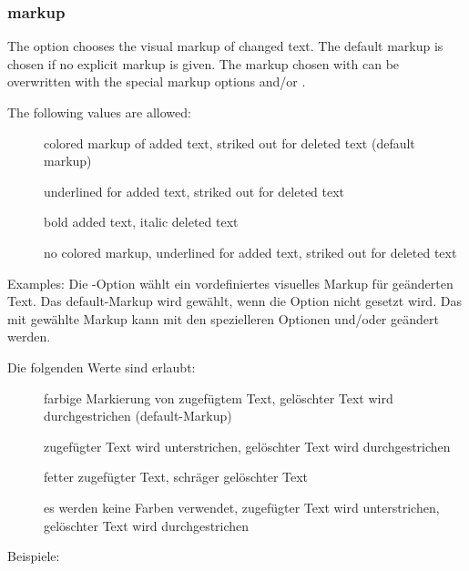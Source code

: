 
\subsubsection{markup}
\ifENGLISH
The  option chooses the visual markup of changed text.
The default markup is chosen if no explicit markup is given.
The markup chosen with  can be overwritten with the special markup options  and/or .

The following values are allowed:
\begin{description}
	\item [] colored markup of added text, striked out for deleted text (default markup)
	\item [] underlined for added text, striked out for deleted text
	\item [] bold added text, italic deleted text
	\item [] no colored markup, underlined for added text, striked out for deleted text
\end{description}

Examples:
\fi
\ifGERMAN
	Die -Option wählt ein vordefiniertes visuelles Markup für geänderten Text.
	Das default-Markup wird gewählt, wenn die Option nicht gesetzt wird.
	Das mit  gewählte Markup kann mit den spezielleren Optionen  und/oder  geändert werden.

	Die folgenden Werte sind erlaubt:
	\begin{description}
		\item [] farbige Markierung von zugefügtem Text, gelöschter Text wird durchgestrichen (default-Markup)
		\item [] zugefügter Text wird unterstrichen, gelöschter Text wird durchgestrichen
		\item [] fetter zugefügter Text, schräger gelöschter Text
		\item [] es werden keine Farben verwendet, zugefügter Text wird unterstrichen, gelöschter Text wird durchgestrichen
	\end{description}

	Beispiele:
\fi

\\
\\
\\

